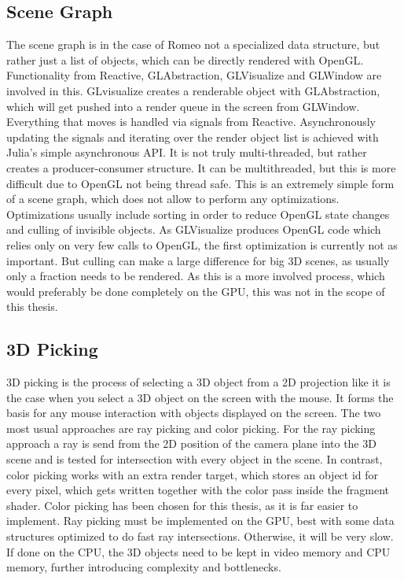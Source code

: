 \subsection{Scene Graph}
The scene graph is in the case of Romeo not a specialized data structure, but rather just a list of objects, which can be directly rendered with OpenGL. Functionality from Reactive, GLAbstraction, GLVisualize and GLWindow are involved in this. GLvisualize creates a renderable object with GLAbstraction, which will get pushed into a render queue in the screen from GLWindow. Everything that moves is handled via signals from Reactive.
Asynchronously updating the signals and iterating over the render object list is achieved with Julia's simple asynchronous API. It is not truly multi-threaded, but rather creates a producer-consumer structure. It can be multithreaded, but this is more difficult due to \ac{OpenGL} not being thread safe.
This is an extremely simple form of a scene graph, which does not allow to perform any optimizations.
Optimizations usually include sorting in order to reduce OpenGL state changes and culling of invisible objects.
As GLVisualize produces OpenGL code which relies only on very few calls to OpenGL, the first optimization is currently not as important.
But culling can make a large difference for big 3D scenes, as usually only a fraction needs to be rendered.
As this is a more involved process, which would preferably be done completely on the GPU, this was not in the scope of this thesis.

\subsection{3D Picking}

3D picking is the process of selecting a 3D object from a 2D projection like it is the case when you select a 3D object on the screen with the mouse.
It forms the basis for any mouse interaction with objects displayed on the screen.
The two most usual approaches are ray picking and color picking.
For the ray picking approach a ray is send from the 2D position of the camera plane into the 3D scene and is tested for intersection with every object in the scene. In contrast, color picking works with an extra render target, which stores an object id for every pixel, which gets written together with the color pass inside the fragment shader.
Color picking has been chosen for this thesis, as it is far easier to implement. Ray picking must be implemented on the GPU, best with some data structures optimized to do fast ray intersections. Otherwise, it will be very slow. If done on the CPU, the 3D objects need to be kept in video memory and CPU memory, further introducing complexity and bottlenecks.

